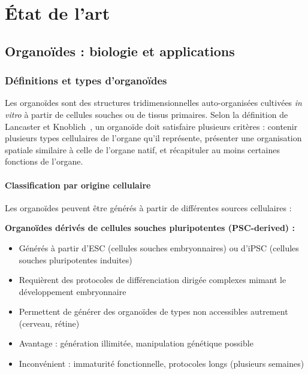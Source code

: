 
\chapter{État de l'art}

\section{Organoïdes : biologie et applications}

\subsection{Définitions et types d'organoïdes}

Les organoïdes sont des structures tridimensionnelles auto-organisées cultivées \textit{in vitro} à partir de cellules souches ou de tissus primaires. Selon la définition de Lancaster et Knoblich~\cite{Lancaster2014}, un organoïde doit satisfaire plusieurs critères : contenir plusieurs types cellulaires de l'organe qu'il représente, présenter une organisation spatiale similaire à celle de l'organe natif, et récapituler au moins certaines fonctions de l'organe.

\subsubsection{Classification par origine cellulaire}

Les organoïdes peuvent être générés à partir de différentes sources cellulaires :

\textbf{Organoïdes dérivés de cellules souches pluripotentes (PSC-derived) :}
\begin{itemize}
    \item Générés à partir d'ESC (cellules souches embryonnaires) ou d'iPSC (cellules souches pluripotentes induites)
    \item Requièrent des protocoles de différenciation dirigée complexes mimant le développement embryonnaire
    \item Permettent de générer des organoïdes de types non accessibles autrement (cerveau, rétine)
    \item Avantage : génération illimitée, manipulation génétique possible
    \item Inconvénient : immaturité fonctionnelle, protocoles longs (plusieurs semaines)
\end{itemize}


